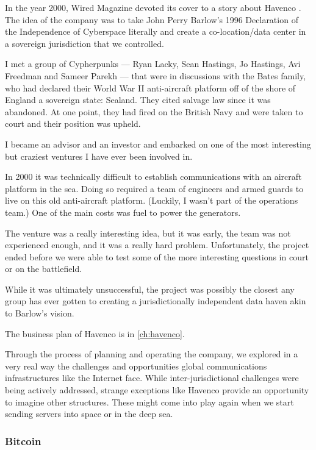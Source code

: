 In the year 2000, Wired Magazine devoted its cover to a story about Havenco \cite{garfinkel2000welcome}. The idea of the company was to take John Perry Barlow's 1996 Declaration of the Independence of Cyberspace \cite{barlow1996declaration} literally and create a co-location/data center in a sovereign jurisdiction that we controlled. 

I met a group of Cypherpunks --- Ryan Lacky, Sean Hastings, Jo Hastings, Avi Freedman and Sameer Parekh --- that were in discussions with the Bates family, who had declared their World War II anti-aircraft platform off of the shore of England a sovereign state: Sealand. They cited salvage law since it was abandoned. At one point, they had fired on the British Navy and were taken to court and their position was upheld.

I became an advisor and an investor and embarked on one of the most interesting but craziest ventures I have ever been involved in.

In 2000 it was technically difficult to establish communications with an aircraft platform in the sea. Doing so required a team of engineers and armed guards to live on this old anti-aircraft platform. (Luckily, I wasn't part of the operations team.) One of the main costs was fuel to power the generators.

The venture was a really interesting idea, but it was early, the team was not experienced enough, and it was a really hard problem. Unfortunately, the project ended before we were able to test some of the more interesting questions in court or on the battlefield.

While it was ultimately unsuccessful, the project was possibly the closest any group has ever gotten to creating a jurisdictionally independent data haven akin to Barlow's vision.

The business plan of Havenco is in \autoref{ch:havenco}.

Through the process of planning and operating the company, we explored in a very real way the challenges and opportunities global communications infrastructures like the Internet face. While inter-jurisdictional challenges were being actively addressed, strange exceptions like Havenco provide an opportunity to imagine other structures. These might come into play again when we start sending servers into space or in the deep sea.

\subsubsection{Bitcoin}
\label{sec:DCI}


